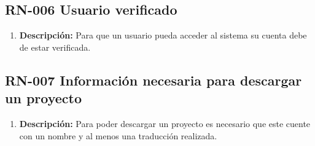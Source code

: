 \subsection{RN-006 Usuario verificado} \label{RN006}
    \begin{enumerate}[label= ]
        \item \textbf{Descripción:} Para que un usuario pueda acceder al sistema su cuenta debe de estar verificada.
    \end{enumerate}
\subsection{RN-007 Información necesaria para descargar un proyecto} \label{RN007}
    \begin{enumerate}[label= ]
        \item \textbf{Descripción:} Para poder descargar un proyecto es necesario que este cuente con un nombre y al menos una traducción realizada.
    \end{enumerate}